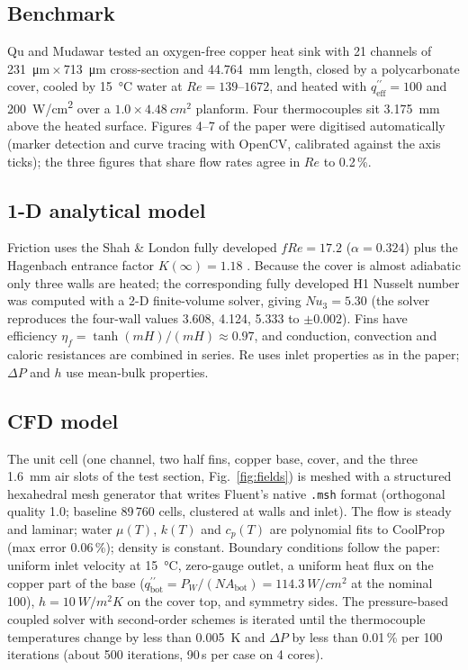 \documentclass[10pt,a4paper]{article}
\newcommand{\qeff}{q^{\prime\prime}_\mathrm{eff}}
\newcommand{\qbot}{q^{\prime\prime}_\mathrm{bot}}
\begin{document}
\subsection{Benchmark}
Qu and Mudawar \cite{qu2002} tested an oxygen-free copper heat sink with 21 channels of \SI{231}{\micro m}\,$\times$\,\SI{713}{\micro m} cross-section and \SI{44.764}{mm} length, closed by a polycarbonate cover, cooled by \SI{15}{\celsius} water at $Re = 139$--$1672$, and heated with $\qeff = 100$ and \SI{200}{W/cm^2} over a $1.0\times\SI{4.48}{cm^2}$ planform. Four thermocouples sit \SI{3.175}{mm} above the heated surface. Figures 4--7 of the paper were digitised automatically (marker detection and curve tracing with OpenCV, calibrated against the axis ticks); the three figures that share flow rates agree in $Re$ to 0.2\,\%.

\subsection{1-D analytical model}
Friction uses the Shah \& London fully developed $fRe = 17.2$ ($\alpha = 0.324$) plus the Hagenbach entrance factor $K(\infty) = 1.18$ \cite{shah1978}. Because the cover is almost adiabatic only three walls are heated; the corresponding fully developed H1 Nusselt number was computed with a 2-D finite-volume solver, giving $Nu_3 = 5.30$ (the solver reproduces the four-wall values 3.608, 4.124, 5.333 to $\pm 0.002$). Fins have efficiency $\eta_f = \tanh(mH)/(mH) \approx 0.97$, and conduction, convection and caloric resistances are combined in series. Re uses inlet properties as in the paper; $\Delta P$ and $h$ use mean-bulk properties.

\subsection{CFD model}
The unit cell (one channel, two half fins, copper base, cover, and the three \SI{1.6}{mm} air slots of the test section, Fig.~\ref{fig:fields}) is meshed with a structured hexahedral mesh generator that writes Fluent's native \texttt{.msh} format (orthogonal quality 1.0; baseline 89\,760 cells, clustered at walls and inlet). The flow is steady and laminar; water $\mu(T)$, $k(T)$ and $c_p(T)$ are polynomial fits to CoolProp (max error 0.06\,\%); density is constant. Boundary conditions follow the paper: uniform inlet velocity at \SI{15}{\celsius}, zero-gauge outlet, a uniform heat flux on the copper part of the base ($\qbot = P_W/(NA_\mathrm{bot}) = \SI{114.3}{W/cm^2}$ at the nominal 100), $h = \SI{10}{W/m^2K}$ on the cover top, and symmetry sides. The pressure-based coupled solver with second-order schemes is iterated until the thermocouple temperatures change by less than \SI{0.005}{K} and $\Delta P$ by less than 0.01\,\% per 100 iterations (about 500 iterations, 90\,s per case on 4 cores).
\end{document}
